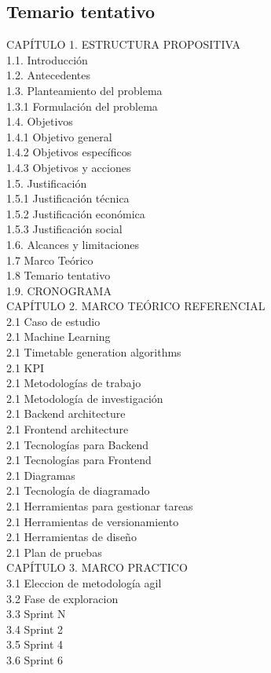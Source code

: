\subsection{Temario tentativo}

CAPÍTULO 1. ESTRUCTURA PROPOSITIVA \\
1.1. Introducción \\
1.2. Antecedentes \\
1.3. Planteamiento del problema \\
1.3.1 Formulación del problema \\
1.4. Objetivos \\
1.4.1 Objetivo general\\
1.4.2 Objetivos específicos \\
1.4.3 Objetivos y acciones \\
1.5. Justificación \\
1.5.1 Justificación técnica \\
1.5.2 Justificación económica \\
1.5.3 Justificación social \\
1.6. Alcances y limitaciones \\
1.7 Marco Teórico \\
1.8 Temario tentativo \\
1.9. CRONOGRAMA \\

CAPÍTULO 2. MARCO TEÓRICO REFERENCIAL \\
2.1 Caso de estudio\\
2.1 Machine Learning\\
2.1 Timetable generation algorithms\\
2.1 KPI\\
2.1 Metodologías de trabajo\\
2.1 Metodología de investigación\\
2.1 Backend architecture\\
2.1 Frontend architecture\\
2.1 Tecnologías para Backend\\
2.1 Tecnologías para Frontend\\
2.1 Diagramas\\
2.1 Tecnología de diagramado\\
2.1 Herramientas para gestionar tareas\\
2.1 Herramientas de versionamiento\\
2.1 Herramientas de diseño\\
2.1 Plan de pruebas\\

CAPÍTULO 3. MARCO PRACTICO \\

3.1 Eleccion de metodología agil \\
3.2 Fase de exploracion \\
3.3 Sprint N \\
3.4 Sprint 2 \\
3.5 Sprint 4 \\
3.6 Sprint 6 \\

